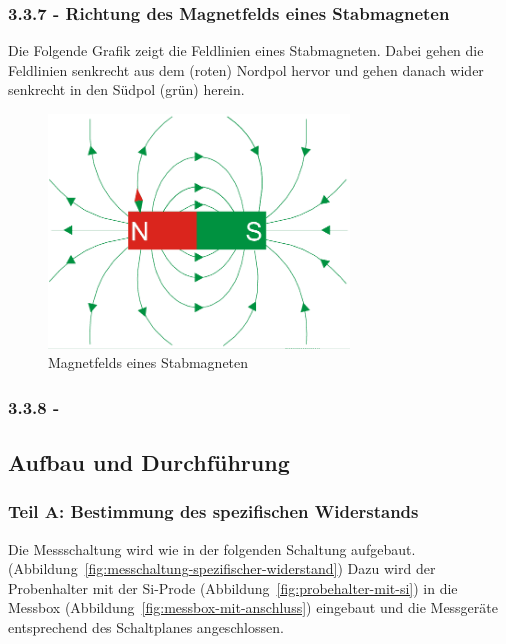 \documentclass[a4paper]{scrartcl}
\numberwithin{equation}{subsection}
\begin{document}

\subsubsection{3.3.7 - Richtung des Magnetfelds eines Stabmagneten}
Die Folgende Grafik zeigt die Feldlinien eines Stabmagneten. Dabei gehen die Feldlinien senkrecht aus dem (roten) Nordpol hervor und gehen danach wider senkrecht in den Südpol (grün) herein.

\begin{figure}[H]
\includegraphics[width=8cm]{stabmagnet}
\centering
\caption{Magnetfelds eines Stabmagneten \protect\footnotemark}
\centering
\label{fig:stabmagnet}
\end{figure}


\subsubsection{3.3.8 - }

\newpage

\subsection{Aufbau und Durchführung}
\subsubsection{Teil A: Bestimmung des spezifischen Widerstands}

Die Messschaltung wird wie in der folgenden Schaltung aufgebaut. (Abbildung~\ref{fig:messchaltung-spezifischer-widerstand})
Dazu wird der Probenhalter mit der Si-Prode (Abbildung~\ref{fig:probehalter-mit-si}) in die Messbox (Abbildung~\ref{fig:messbox-mit-anschluss}) eingebaut und die Messgeräte entsprechend des Schaltplanes angeschlossen.
\end{document}

